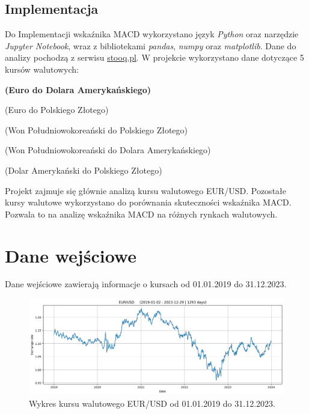 \documentclass[12pt, a4paper]{article}
\begin{document}
\subsection{Implementacja}
Do Implementacji wskaźnika MACD wykorzystano język \textit{Python} oraz narzędzie
\textit{Jupyter Notebook}, wraz z bibliotekami \textit{pandas}, \textit{numpy} oraz \textit{matplotlib}.
Dane do analizy pochodzą z serwisu \href{https://stooq.pl/}{stooq.pl}.
W projekcie wykorzystano dane dotyczące 5 kursów walutowych:
\small
\begin{description}
    \setlength\itemsep{0.01em}
    \item[EUR/USD] \textbf{(Euro do Dolara Amerykańskiego)}
    \item[EUR/PLN] (Euro do Polskiego Złotego)
    \item[KRW/PLN] (Won Południowokoreański do Polskiego Złotego)
    \item[KRW/USD] (Won Południowokoreański do Dolara Amerykańskiego)
    \item[USD/PLN] (Dolar Amerykański do Polskiego Złotego)
\end{description}
\small
Projekt zajmuje się głównie analizą kursu walutowego EUR/USD. Pozostałe kursy
walutowe wykorzystano do porównania skuteczności wskaźnika MACD.
Pozwala to na analizę wskaźnika MACD na różnych rynkach walutowych.

\pagebreak






\section{Dane wejściowe}

Dane wejściowe zawierają informacje o kursach od 01.01.2019 do 31.12.2023.

\begin{figure}[ht]
    \centering
    \includegraphics[width=1.0\textwidth]{eur_usd_value.png}
    \caption{Wykres kursu walutowego EUR/USD od 01.01.2019 do 31.12.2023.}
    \label{fig:eur_usd_value}
\end{figure}
\end{document}

